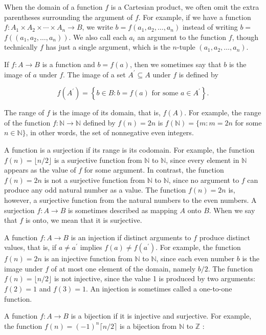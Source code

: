 \documentclass[lang=cn,newtx,10pt,scheme=chinese]{elegantbook}
\begin{document}
When the domain of a function $f$ is a Cartesian product, we often omit the extra parentheses surrounding the argument of $f$. For example, if we have a function $f: A_1 \times A_2 \times \cdots \times A_n \rightarrow B$, we write $b=f\left(a_1, a_2, \ldots, a_n\right)$ instead of writing $b=$ $f\left(\left(a_1, a_2, \ldots, a_n\right)\right)$. We also call each $a_i$ an argument to the function $f$, though technically $f$ has just a single argument, which is the $n$-tuple $\left(a_1, a_2, \ldots, a_n\right)$.

If $f: A \rightarrow B$ is a function and $b=f(a)$, then we sometimes say that $b$ is the image of $a$ under $f$. The image of a set $A^{\prime} \subseteq A$ under $f$ is defined by

$$
f\left(A^{\prime}\right)=\left\{b \in B: b=f(a) \text { for some } a \in A^{\prime}\right\} .
$$

The range of $f$ is the image of its domain, that is, $f(A)$. For example, the range of the function $f: \mathbb{N} \rightarrow \mathbb{N}$ defined by $f(n)=2 n$ is $f(\mathbb{N})=\{m: m=2 n$ for some $n \in \mathbb{N}\}$, in other words, the set of nonnegative even integers.

A function is a surjection if its range is its codomain. For example, the function $f(n)=\lfloor n / 2\rfloor$ is a surjective function from $\mathbb{N}$ to $\mathbb{N}$, since every element in $\mathbb{N}$ appears as the value of $f$ for some argument. In contrast, the function $f(n)=2 n$ is not a surjective function from $\mathbb{N}$ to $\mathbb{N}$, since no argument to $f$ can produce any odd natural number as a value. The function $f(n)=2 n$ is, however, a surjective function from the natural numbers to the even numbers. A surjection $f: A \rightarrow B$ is sometimes described as mapping $A$ onto $B$. When we say that $f$ is onto, we mean that it is surjective.

A function $f: A \rightarrow B$ is an injection if distinct arguments to $f$ produce distinct values, that is, if $a \neq a^{\prime}$ implies $f(a) \neq f\left(a^{\prime}\right)$. For example, the function $f(n)=2 n$ is an injective function from $\mathbb{N}$ to $\mathbb{N}$, since each even number $b$ is the image under $f$ of at most one element of the domain, namely $b / 2$. The function $f(n)=\lfloor n / 2\rfloor$ is not injective, since the value 1 is produced by two arguments: $f(2)=1$ and $f(3)=1$. An injection is sometimes called a one-to-one function.

A function $f: A \rightarrow B$ is a bijection if it is injective and surjective. For example, the function $f(n)=(-1)^n\lceil n / 2\rceil$ is a bijection from $\mathbb{N}$ to $\mathbb{Z}$ :
\end{document}
